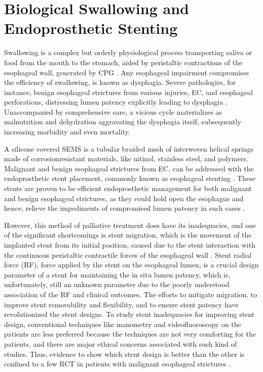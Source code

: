 \section{Biological Swallowing and Endoprosthetic Stenting}

Swallowing is a complex but orderly physiological process transporting
saliva or food from the mouth to the stomach, aided by peristaltic
contractions of the esophageal wall, generated by \ac{CPG} \citep{Jean2001}. Any esophageal impairment compromises the
efficiency of swallowing, is known as dysphagia. Severe pathologies,
for instance, benign esophageal strictures from various injuries,
\ac{EC}, and esophageal perforations, distressing lumen patency
explicitly leading to dysphagia \citep{Garcia2010}. Unaccompanied by
comprehensive care, a vicious cycle materializes as malnutrition and
dehydration aggravating the dysphagia itself, subsequently increasing
morbidity and even mortality.

A silicone covered \ac{SEMS} is a tubular
braided mesh of interwoven helical springs made of corrosionresistant
materials, like nitinol, stainless steel, and polymers. Malignant
and benign esophageal strictures from \ac{EC}, can be
addressed with the endoprosthetic stent placement, commonly known
as esophageal stenting \citep{hanawa2009materials}. These stents are proven to be efficient endoprosthetic
management for both malignant and benign esophageal
strictures, as they could hold open the esophagus and hence, relieve
the impediments of compromised lumen patency in such cases \citep{hirdes2013vitro}.

However, this method of palliative treatment does have its inadequacies,
and one of the significant shortcomings is stent migration,
which is the movement of the implanted stent from its initial position,
caused due to the stent interaction with the continuous peristaltic
contractile forces of the esophageal wall \citep{sharma2010role}. Stent radial force (RF), force applied by the stent on the esophageal lumen, is a crucial design parameter of a stent for maintaining the in situ lumen patency, which is, unfortunately, still an unknown parameter due to the poorly understood association of the RF and clinical outcomes. The efforts to mitigate
migration, to improve stent removability and flexibility, and to ensure
stent patency have revolutionized the stent designs. To study stent
inadequacies for improving stent design, conventional techniques like
manometry and videofluoroscopy on the patients are less preferred
because the techniques are not very comforting for the patients, and
there are major ethical concerns associated with such kind of studies.
Thus, evidence to show which stent design is better than the other is
confined to a few \ac{RCT} in patients with
malignant esophageal strictures \citep{hirdes2013vitro}.


